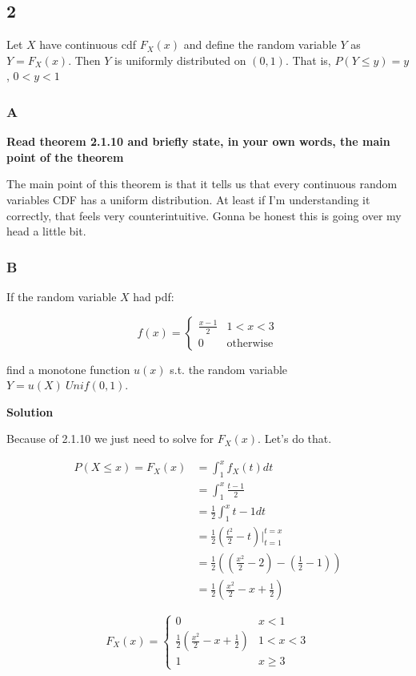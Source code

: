 \subsection*{2}

\begin{theorem}
	Let $X$ have continuous cdf $F_X(x)$ and define the random variable $Y$ as $Y = F_X(x)$. Then $Y$ is uniformly distributed on $(0,1)$. That is, $P(Y \leq y) = y$, $0 < y < 1$
\end{theorem}

\subsubsection*{A}

\textbf{Read theorem 2.1.10 and briefly state, in your own words, the main point of the theorem}

The main point of this theorem is that it tells us that every continuous random variables CDF has a uniform distribution. At least if I'm understanding it correctly, that feels very counterintuitive. Gonna be honest this is going over my head a little bit. 

\subsubsection*{B}

If the random variable $X$ had pdf:

\[
	f(x) = \begin{cases}
		\frac{x-1}{2} & 1 < x < 3 \\
		0 & \text{otherwise}
	\end{cases}
\]

find a monotone function $u(x)$ s.t. the random variable $Y=u(X) ~ Unif(0,1)$.

\noindent \textbf{Solution}

Because of 2.1.10 we just need to solve for $F_X(x)$. Let's do that.

\begin{align*}
	P(X \leq x) = F_X(x) &= \int_1^x f_X(t) dt \\
	&= \int_1^x \frac{t-1}{2} \\
	&= \frac{1}{2} \int_1^x t-1 dt \\
	&= \frac{1}{2} \left( \frac{t^2}{2} - t \right) \bigg\rvert_{t=1}^{t=x} \\
	&= \frac{1}{2} \left( \left( \frac{x^2}{2} - 2 \right) - \left( \frac{1}{2} - 1 \right) \right) \\
	&= \frac{1}{2} \left( \frac{x^2}{2} - x + \frac{1}{2} \right)
\end{align*}

\[
	F_X(x) = \begin{cases}
		0 & x < 1 \\
		\frac{1}{2} \left( \frac{x^2}{2} - x + \frac{1}{2} \right) & 1 < x < 3 \\
		1 & x \geq 3
	\end{cases}
\]
